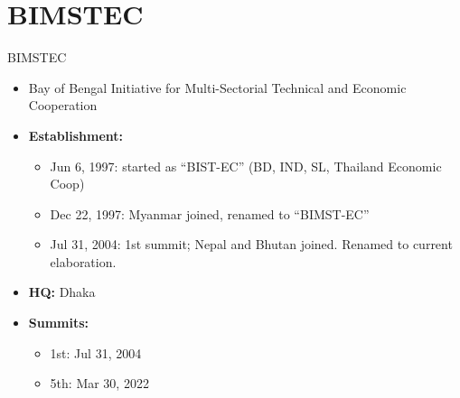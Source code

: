 \documentclass[
  12pt,
  ignorenonframetext,
  progressbar=frametitle]{beamer}
\providecommand{\tightlist}{%
  \setlength{\itemsep}{0pt}\setlength{\parskip}{0pt}}
\begin{document}
\section{BIMSTEC}
\begin{frame}[allowframebreaks]
{BIMSTEC}
\protect\hypertarget{bimstec}{}
\begin{itemize}
\tightlist
\item
  Bay of Bengal Initiative for Multi-Sectorial Technical and Economic
  Cooperation
\item
  \textbf{Establishment:}

  \begin{itemize}
  \tightlist
  \item
    Jun 6, 1997: started as ``BIST-EC'' (BD, IND, SL, Thailand Economic
    Coop)
  \item
    Dec 22, 1997: Myanmar joined, renamed to ``BIMST-EC''
  \item
    Jul 31, 2004: 1st summit; Nepal and Bhutan joined. Renamed to
    current elaboration.
  \end{itemize}
\item
  \textbf{HQ:} Dhaka
\item
  \textbf{Summits:}

  \begin{itemize}
  \tightlist
  \item
    1st: Jul 31, 2004
  \item
    5th: Mar 30, 2022
  \end{itemize}
\end{itemize}
\end{frame}
\end{document}
